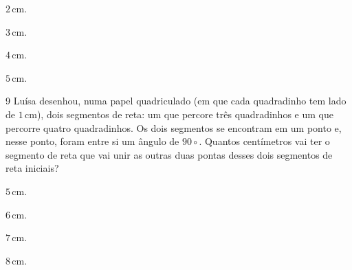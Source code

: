 \begin{escolha}
\item $2\,\text{cm}$.
\item $3\,\text{cm}$.
\item $4\,\text{cm}$.
\item $5\,\text{cm}$.
\end{escolha}



\num{9} Luísa desenhou, numa papel quadriculado (em que cada quadradinho
tem lado de $1\,\text{cm}$), dois segmentos de reta: um que percore três
quadradinhos e um que percorre quatro quadradinhos. Os dois segmentos se
encontram em um ponto e, nesse ponto, foram entre si um ângulo de $90\circ$.
Quantos centímetros vai ter o segmento de reta que vai unir as outras duas
pontas desses dois segmentos de reta iniciais?

\begin{escolha}
\item $5\,\text{cm}$.
\item $6\,\text{cm}$.
\item $7\,\text{cm}$.
\item $8\,\text{cm}$.
\end{escolha}


